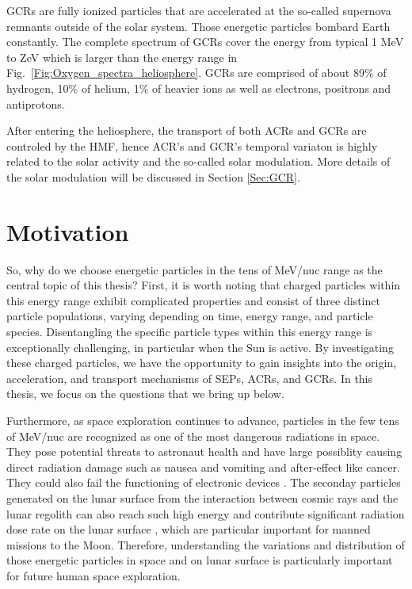 \acp{GCR} are fully ionized particles that are accelerated at the so-called supernova remnants \citep{Blasi2013AARv2013} outside of the solar system. Those energetic particles bombard Earth constantly. The complete spectrum of \acp{GCR} cover the energy from typical 1 MeV \citep{Potgieter2013LRSP} to ZeV which is larger than the energy range in Fig.~\ref{Fig:Oxygen_spectra_heliosphere}. \acp{GCR} are comprised of about 89\% of hydrogen, 10\% of helium, 1\% of heavier ions as well as electrons, positrons and antiprotons. 

After entering the heliosphere, the transport of both \acp{ACR} and \acp{GCR} are controled by the \ac{HMF}, hence \ac{ACR}'s and \ac{GCR}'s temporal variaton is highly related to the solar activity and the so-called solar modulation. More details of the solar modulation will be discussed in Section \ref{Sec:GCR}.









\section{Motivation}

So, why do we choose energetic particles in the tens of MeV/nuc range as the central topic of this thesis? First, it is worth noting that charged particles within this energy range exhibit complicated properties and consist of three distinct particle populations, varying depending on time, energy range, and particle species. Disentangling the specific particle types within this energy range is exceptionally challenging, in particular when the Sun is active.
By investigating these charged particles, we have the opportunity to gain insights into the origin, acceleration, and transport mechanisms of \acp{SEP}, \acp{ACR}, and \acp{GCR}. In this thesis, we focus on the questions that we bring up below.

Furthermore, as space exploration continues to advance, particles in the few tens of MeV/nuc are recognized as one of the most dangerous radiations in space. They pose potential threats to astronaut health and have large possiblity causing direct radiation damage such as nausea and vomiting and after-effect like cancer. They could also fail the functioning of electronic devices \citep{Reames2021LNP,  mckenna2015recommendations, armstrong2014strategies}. The seconday particles generated on the lunar surface from the interaction between cosmic rays and the lunar regolith can also reach such high energy and contribute significant radiation dose rate on the lunar surface \citep{Schwadron2016Icarus}, which are particular important for manned missions to the Moon. Therefore, understanding the variations and distribution of those energetic particles in space and on lunar surface is particularly important for future human space exploration.

